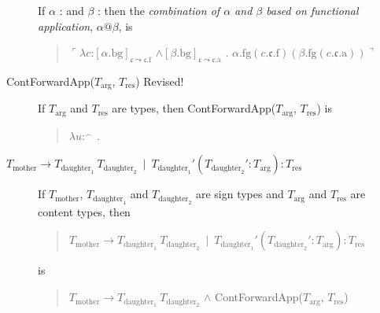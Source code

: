 \begin{description}
  If $\alpha$ :  
and $\beta$ : 
                         then the \textit{combination of $\alpha$ and
    $\beta$  based on functional application}, $\alpha\text{@}\beta$, is
\begin{quote}
  $\ulcorner\lambda c$:$[\alpha.\text{bg}]_{\mathfrak{c}\leadsto\mathfrak{c}.\text{f}}$
      \d{$\wedge$}$[\beta.\text{bg}]_{\mathfrak{c}\leadsto\mathfrak{c}.\text{a}}$
  . $\alpha.\text{fg}(c.\mathfrak{c}.\text{f})(\beta.\text{fg}(c.\mathfrak{c}.\text{a}))\urcorner$
\end{quote}


\item[\textnormal{ContForwardApp($T_{\text{arg}}$, $T_{\text{res}}$)} Revised!] \mbox{}

  If $T_{\text{arg}}$ and $T_{\text{res}}$ are types, then
  ContForwardApp($T_{\text{arg}}$, $T_{\text{res}}$) is
\begin{quote}
  $\lambda
u$:$^{\frown}$ . \\
\hspace*{2em}

\end{quote}

\item[\textnormal{$T_{\text{mother}}\longrightarrow
    T_{\text{daughter}_1}\ T_{\text{daughter}_2}\ \mid\
    T_{\text{daughter}_1}'(T_{\text{daughter}_2}':T_{\text{arg}}):T_{\text{res}}$}]
  \mbox{}

  If $T_{\text{mother}}$, $T_{\text{daughter}_1}$ and
  $T_{\text{daughter}_2}$ are sign types and $T_{\text{arg}}$ and
  $T_{\text{res}}$ are content types, then
  \begin{quote}
    $T_{\text{mother}}\longrightarrow
    T_{\text{daughter}_1}\ T_{\text{daughter}_2}\ \mid\
    T_{\text{daughter}_1}'(T_{\text{daughter}_2}':T_{\text{arg}}):T_{\text{res}}$
  \end{quote}
  is
  \begin{quote}
  $T_{\text{mother}}\longrightarrow
    T_{\text{daughter}_1}\ T_{\text{daughter}_2}$ \d{\d{$\wedge$}}
    ContForwardApp($T_{\text{arg}}$, $T_{\text{res}}$)
  \end{quote}

  


  
  

\end{description}


